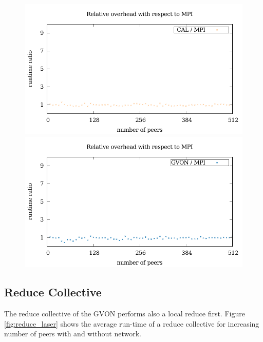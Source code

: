 \begin{figure}[H]
\begin{minipage}[t]{0.5\textwidth}
    \includegraphics[width=\textwidth]{plots/50_collective_network_overhead_cal_laser}
    \includegraphics[width=\textwidth]{plots/50_collective_network_overhead_gvon_laser}
  \end{minipage}%
  \caption{ }
  \label{fig:gather_laser}
\end{figure}

\subsection*{Reduce Collective}
The reduce collective of the GVON performs also a local reduce first.
Figure \ref{fig:reduce_laser} shows the average run-time of a reduce
collective for increasing number of peers with and without network.


